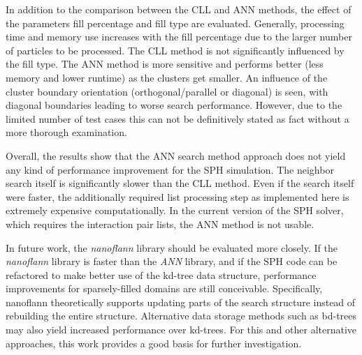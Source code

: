 In addition to the comparison between the CLL and ANN methods, the effect of the parameters fill percentage and fill type are evaluated. Generally, processing time and memory use increases with the fill percentage due to the larger number of particles to be processed. The CLL method is not significantly influenced by the fill type. The ANN method is more sensitive and performs better (less memory and lower runtime) as the clusters get smaller. An influence of the cluster boundary orientation (orthogonal/parallel or diagonal) is seen, with diagonal boundaries leading to worse search performance. However, due to the limited number of test cases this can not be definitively stated as fact without a more thorough examination.

Overall, the results show that the ANN search method approach does not yield any kind of performance improvement for the SPH simulation. The neighbor search itself is significantly slower than the CLL method. Even if the search itself were faster, the additionally required list processing step as implemented here is extremely  expensive computationally. In the current version of the SPH solver, which requires the interaction pair lists, the ANN method is not usable.

In future work, the {\itshape nanoflann} library should be evaluated more closely. If the {\itshape nanoflann} library is faster than the {\itshape ANN} library, and if the SPH code can be refactored to make better use of the kd-tree data structure, performance improvements for sparsely-filled domains are still conceivable.  Specifically, nanoflann theoretically supports updating parts of the search structure instead of rebuilding the entire structure. Alternative data storage methods such as bd-trees may also yield increased performance over kd-trees. For this and other alternative approaches, this work provides a good basis for further investigation.
